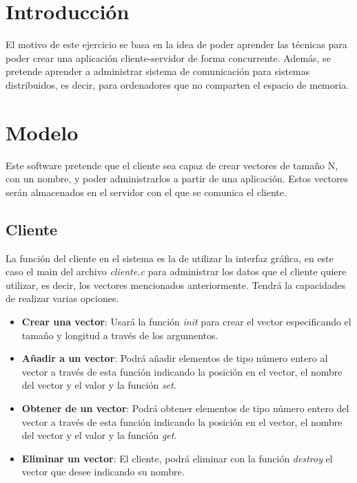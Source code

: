 \documentclass[10pt, spanish, pdftex]{template/UC3M_document}
\author{Alejandro Prieto Macías}         %
\begin{document}
\titleMain

\begin{spacing}{0.5}
    \hypersetup{linkcolor=black}    %
    \tableofcontents\newpage        %
\end{spacing}


\section{Introducción}\label{section_label}
El motivo de este ejercicio se basa en la idea de poder aprender las técnicas para poder crear una aplicación cliente-servidor de forma concurrente. Además, se pretende aprender a administrar sistema de comunicación para sistemas distribuidos, es decir, para ordenadores que no comparten el espacio de memoria.



\newpage
\section{Modelo}
Este software pretende que el cliente sea capaz de crear vectores de tamaño N, con un nombre, y poder administrarlos a partir de una aplicación. Estos vectores serán almacenados en el servidor con el que se comunica el cliente.

\subsection{Cliente}
La función del cliente en el sistema es la de utilizar la interfaz gráfica, en este caso el main del archivo \textit{cliente.c} para administrar los datos que el cliente quiere utilizar, es decir, los vectores mencionados anteriormente. Tendrá la capacidades de realizar varias opciones.

\begin{itemize}
  \item \textbf{Crear una vector}: Usará la función \textit{init} para crear el vector especificando el tamaño y longitud a través de los argumentos.
  \item \textbf{Añadir a un vector}: Podrá añadir elementos de tipo número entero al vector a través de esta función indicando la posición en el vector, el nombre del vector y el valor y la función \textit{set}.
  \item \textbf{Obtener de un vector}: Podrá obtener elementos de tipo número entero del vector a través de esta función indicando la posición en el vector, el nombre del vector y el valor y la función \textit{get}.
  \item \textbf{Eliminar un vector}: El cliente, podrá eliminar con la función \textit{destroy} el vector que desee indicando su nombre.
\end{itemize}
\end{document}
